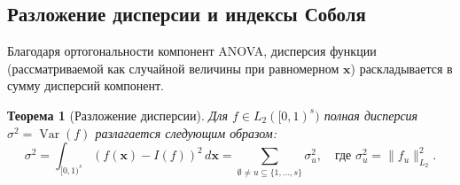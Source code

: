 \documentclass[12pt, a4paper]{article}
\theoremstyle{plain}
\newtheorem{theorem}{Теорема}[section]
\theoremstyle{definition}
\theoremstyle{remark}
\DeclareMathOperator{\Var}{Var}
\newcommand{\II}{[0, 1)}
\newcommand{\Is}{\{1, \dots, s\}}
\newcommand{\vx}{\boldsymbol{x}}
\begin{document}
\subsection{Разложение дисперсии и индексы Соболя}
Благодаря ортогональности компонент ANOVA, дисперсия функции (рассматриваемой как случайной величины при равномерном $\vx$) раскладывается в сумму дисперсий компонент.

\begin{theorem}[Разложение дисперсии]
    \label{thm:variance_decomp}
    Для $f \in L_2(\II^s)$ полная дисперсия $\sigma^2 = \Var(f)$ разлагается следующим образом:
    \begin{equation}
        \sigma^2 = \int_{\II^s} (f(\vx) - I(f))^2 \, d\vx = \sum_{\emptyset \neq u \subseteq \Is} \sigma_u^2, \quad \text{где } \sigma_u^2 = \|f_u\|_{L_2}^2.
    \end{equation}
\end{theorem}
\end{document}
